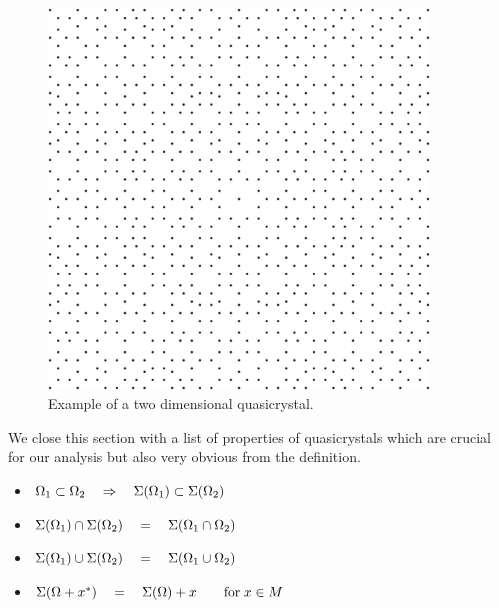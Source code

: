\documentclass[text.tex]{subfiles}
\begin{document}
\begin{figure}[h]
\centering
\includegraphics[width=0.9\textwidth]{img/firstExample}
\caption{Example of a two dimensional quasicrystal.}
\label{fig_quasicrystalFirstExample}
\end{figure}

We close this section with a list of properties of quasicrystals which are crucial for our analysis but also very obvious from the definition. 

\begin{itemize}
\item $\Omega_1\subset\Omega_2 \quad\Rightarrow\quad \Sigma(\Omega_1)\subset\Sigma(\Omega_2)$
\item $\Sigma(\Omega_1)\cap\Sigma(\Omega_2) \quad=\quad \Sigma(\Omega_1\cap\Omega_2)$
\item $\Sigma(\Omega_1)\cup\Sigma(\Omega_2) \quad=\quad \Sigma(\Omega_1\cup\Omega_2)$
\item $\Sigma(\Omega+x^\ast) \quad=\quad \Sigma(\Omega)+x\qquad \text{for}\; x\in M$
\end{itemize}
\end{document}
